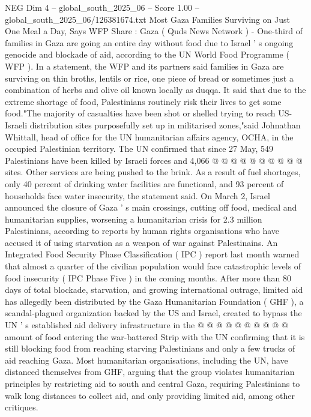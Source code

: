 \begin{textsample}{NEG Dim 4 – global\_south\_2025\_06 – Score 1.00 – global\_south\_2025\_06/126381674.txt}  \label{ex:f4_neg_102}
Most Gaza Families Surviving on Just One Meal a Day, Says WFP Share : Gaza ( Quds News Network ) - One-third of families in Gaza are going an entire day without food due to Israel ' s ongoing genocide and blockade of aid, according to the UN World Food Programme ( WFP ).
In a statement, the WFP and its partners said families in Gaza are surviving on thin broths, lentils or rice, one piece of bread or sometimes just a combination of herbs and olive oil known locally as duqqa.
It said that due to the extreme shortage of food, Palestinians routinely risk their lives to get some food."The majority of casualties have been shot or shelled trying to reach US-Israeli distribution sites purposefully set up in militarised zones,"said Johnathan Whittall, head of office for the UN humanitarian affairs agency, OCHA, in the occupied Palestinian territory.
The UN confirmed that since 27 May, 549 Palestinians have been killed by Israeli forces and 4,066 @ @ @ @ @ @ @ @ @ @ sites.
Other services are being pushed to the brink.
As a result of fuel shortages, only 40 percent of drinking water facilities are functional, and 93 percent of households face water insecurity, the statement said.
On March 2, Israel announced the closure of Gaza ' s main crossings, cutting off food, medical and humanitarian supplies, worsening a humanitarian crisis for 2.3 million Palestinians, according to reports by human rights organisations who have accused it of using starvation as a weapon of war against Palestinains.
An Integrated Food Security Phase Classification ( IPC ) report last month warned that almost a quarter of the civilian population would face catastrophic levels of food insecurity ( IPC Phase Five ) in the coming months.
After more than 80 days of total blockade, starvation, and growing international outrage, limited aid has allegedly been distributed by the Gaza Humanitarian Foundation ( GHF ), a scandal-plagued organization backed by the US and Israel, created to bypass the UN ' s established aid delivery infrastructure in the @ @ @ @ @ @ @ @ @ @ amount of food entering the war-battered Strip with the UN confirming that it is still blocking food from reaching starving Palestinians and only a few trucks of aid reaching Gaza.
Most humanitarian organisations, including the UN, have distanced themselves from GHF, arguing that the group violates humanitarian principles by restricting aid to south and central Gaza, requiring Palestinians to walk long distances to collect aid, and only providing limited aid, among other critiques.

\end{textsample}
